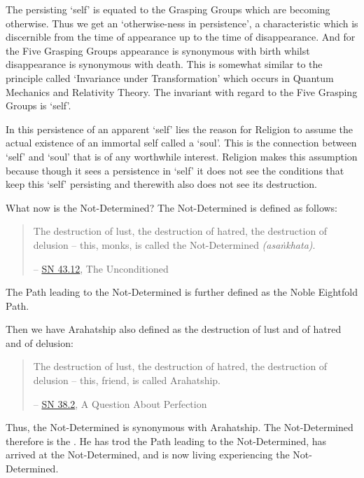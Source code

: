 The persisting `self' is equated to the Grasping Groups which are becoming otherwise. Thus we get an `otherwise-ness in persistence', a characteristic which is discernible from the time of appearance up to the time of disappearance. And for the Five Grasping Groups appearance is synonymous with birth whilst disappearance is synonymous with death. This is somewhat similar to the principle called `Invariance under Transformation' which occurs in Quantum Mechanics and Relativity Theory. The invariant with regard to the Five Grasping Groups is `self'.

In this persistence of an apparent `self' lies the reason for Religion to assume the actual existence of an immortal self called a `soul'. This is the connection between `self' and `soul' that is of any worthwhile interest. Religion makes this assumption because though it sees a persistence in `self' it does not see the conditions that keep this `self' persisting and therewith also does not see its destruction.

\clearpage

What now is the Not-Determined? The Not-Determined is defined as follows:

\begin{quote}
The destruction of lust, the destruction of hatred, the destruction of delusion -- this, monks, is called the Not-Determined \emph{(asaṅkhata)}.

 -- \href{https://suttacentral.net/sn43.12/en/bodhi}{SN 43.12}, The Unconditioned
\end{quote}

The Path leading to the Not-Determined is further defined as the Noble Eightfold Path.

Then we have Arahatship also defined as the destruction of lust and of hatred and of delusion:

\begin{quote}
The destruction of lust, the destruction of hatred, the destruction of delusion -- this, friend, is called Arahatship.

 -- \href{https://suttacentral.net/sn38.2/en/sujato}{SN 38.2}, A Question About Perfection
\end{quote}

\protect\hypertarget{living-experience}{}{}Thus, the Not-Determined is synonymous with Arahatship. The Not-Determined therefore is the . He has trod the Path leading to the Not-Determined, has arrived at the Not-Determined, and is now living experiencing the Not-Determined.

